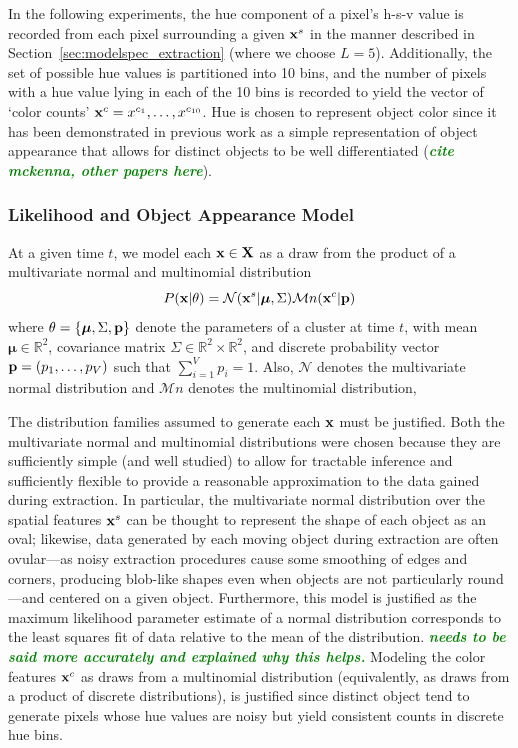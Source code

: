 \documentclass[smallcondensed, final]{svjour3}
\newcommand{\willie}[1]{\textcolor{green}{\textsf{\emph{\textbf{\textcolor{green}{#1}}}}}}
\begin{document}
In the following experiments, the hue component of a pixel's h-s-v value is recorded from each pixel surrounding a given $\bold{x}^{s}$ in the manner described in Section~\ref{sec:modelspec_extraction} (where we choose $L=5$). Additionally, the set of possible hue values is partitioned into 10 bins, and the number of pixels with a hue value lying in each of the 10 bins is recorded to yield the vector of `color counts' $\bold{x}^{c} = x^{c_{1}}, \ldots, x^{c_{10}}$. Hue is chosen to represent object color since it has been demonstrated in previous work as a simple representation of object appearance that allows for distinct objects to be well differentiated (\willie{cite mckenna, other papers here}).



\subsubsection{Likelihood and Object Appearance Model}

At a given time $t$, we model each $\bold{x} \in \bold{X}$ as a draw from the product of a multivariate normal and multinomial distribution
\begin{equation}
P(\bold{x}|\theta) = \mathcal{N}(\bold{x}^{s} | \boldsymbol{\mu}, \Sigma)  \mathcal{M}n(\bold{x}^{c} | \bold{p})
\end{equation}
where $\theta = \{ \boldsymbol{\mu}, \Sigma, \bold{p} \}$ denote the parameters of a cluster at time $t$, with mean $\boldsymbol{\mu} \in \mathbb{R}^{2}$, covariance matrix $\Sigma \in \mathbb{R}^{2} \times \mathbb{R}^{2}$, and discrete probability vector $\bold{p} = (p_{1}, \ldots, p_{V})$ such that $\sum_{i=1}^{V}p_{i} = 1$. Also, $\mathcal{N}$ denotes the multivariate normal distribution and $\mathcal{M}n$ denotes the multinomial distribution, 

The distribution families assumed to generate each $\bold{x}$ must be justified. Both the multivariate normal and multinomial distributions were chosen because they are sufficiently simple (and well studied) to allow for tractable inference and sufficiently flexible to provide a reasonable approximation to the data gained during extraction. In particular, the multivariate normal distribution over the spatial features $\bold{x}^{s}$ can be thought to represent the shape of each object as an oval; likewise, data generated by each moving object during extraction are often ovular---as noisy extraction procedures cause some smoothing of edges and corners, producing blob-like shapes even when objects are not particularly round---and centered on a given object. Furthermore, this model is justified as the maximum likelihood parameter estimate of a normal distribution corresponds to the least squares fit of data relative to the mean of the distribution. \willie{needs to be said more accurately and explained why this helps.} Modeling the color features $\bold{x}^{c}$ as draws from a multinomial distribution (equivalently, as draws from a product of discrete distributions), is justified since distinct object tend to generate pixels whose hue values are noisy but yield consistent counts in discrete hue bins.
\end{document}

